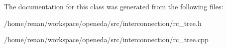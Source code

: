 The documentation for this class was generated from the following files\-:\begin{DoxyCompactItemize}
\item 
/home/renan/workspace/openeda/src/interconnection/rc\-\_\-tree.\-h\item 
/home/renan/workspace/openeda/src/interconnection/rc\-\_\-tree.\-cpp\end{DoxyCompactItemize}
